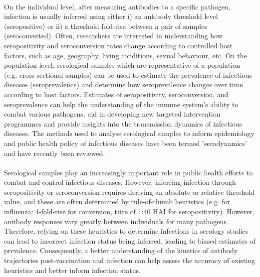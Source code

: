 \paragraph{}On the individual level, after measuring antibodies to a specific pathogen, infection is usually inferred using either i) an antibody threshold level (seropositive) or ii) a threshold fold-rise between a pair of samples (seroconverted).\cite{Haselbeck2022-ob} Often, researchers are interested in understanding how seropositivity and seroconversion rates change according to controlled host factors, such as age, geography, living conditions, sexual behaviour, etc.\cite{Dhar-Chowdhury2017-yi, Wansom2021-jh, Crawford2006-wt} On the population level, serological samples which are representative of a population (e.g. cross-sectional samples) can be used to estimate the prevalence of infectious diseases (seroprevalence) and determine how seroprevalence changes over time according to host factors.\cite{Chan2021-me,Van_den_Berg2023-pl,Colton2021-bt} Estimates of seropositivity, seroconversion, and seroprevalence can help the understanding of the immune system's ability to combat various pathogens, aid in developing new targeted intervention programmes and provide insights into the transmission dynamics of infectious diseases. The methods used to analyse serological samples to inform epidemiology and public health policy of infectious diseases have been termed 'serodynamics' and have recently been reviewed.\cite{Hay2023-ty}

\paragraph{}Serological samples play an increasingly important role in public health efforts to combat and control infectious diseases.\cite{Haselbeck2022-ob,Metcalf2016-tr} However, inferring infection through seropositivity or seroconversion requires deriving an absolute or relative threshold value, and these are often determined by rule-of-thumb heuristics (e.g. for influenza: 4-fold-rise for conversion, titre of 1:40 HAI for seropositivity).\cite{Xu2021-pz} However, antibody responses vary greatly between individuals for many pathogens. Therefore, relying on these heuristics to determine infections in serology studies can lead to incorrect infection status being inferred, leading to biased estimates of prevalence.\cite{Chan2021-me,Cauchemez2012-ui} Consequently, a better understanding of the kinetics of antibody trajectories post-vaccination and infection can help assess the accuracy of existing heuristics and better inform infection status.

